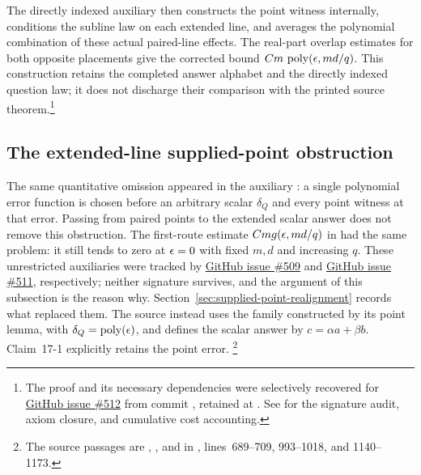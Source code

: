 \documentclass[11pt]{article}
\DeclareMathOperator{\poly}{poly}
\renewcommand{\ghissue}[1]{%
  \href{https://github.com/Dengnifer/MIPStarRE-QPBT/issues/#1}{GitHub issue \##1}}
\begin{document}
The directly indexed auxiliary
 then constructs the point
witness internally, conditions the subline law on each extended line, and
averages the polynomial combination of these actual paired-line effects.
The real-part overlap estimates for both opposite placements give the
corrected bound $C m\,\poly(\eps,md/q)$. This construction retains the
completed answer alphabet and the directly indexed question law; it does not
discharge their comparison with the printed source theorem.\footnote{The
proof and its necessary dependencies were selectively recovered for
\ghissue{512} from commit
, retained at
. See
 for the
signature audit, axiom closure, and cumulative cost accounting.}

\subsection{The extended-line supplied-point obstruction}

The same quantitative omission appeared in the auxiliary
: a single polynomial error
function is chosen before an arbitrary scalar $\delta_Q$ and every point witness
at that error. Passing from paired points to the extended scalar answer does
not remove this obstruction. The first-route estimate
$C m g(\epsilon,md/q)$ in
 had the same
problem: it still tends to zero at $\epsilon=0$ with fixed $m,d$ and increasing $q$.
These unrestricted auxiliaries were tracked by \ghissue{509} and \ghissue{511},
respectively; neither signature survives, and the argument of this subsection is
the reason why. Section~\ref{sec:supplied-point-realignment} records what
replaced them. The source instead uses the family constructed by its point lemma,
with $\delta_Q=\poly(\eps)$, and defines the scalar answer by
$c=\alpha a+\beta b$. Claim~17-1 explicitly retains the point error.
\footnote{The source passages are , , and
 in
,
lines~689--709, 993--1018, and 1140--1173.}
\end{document}
